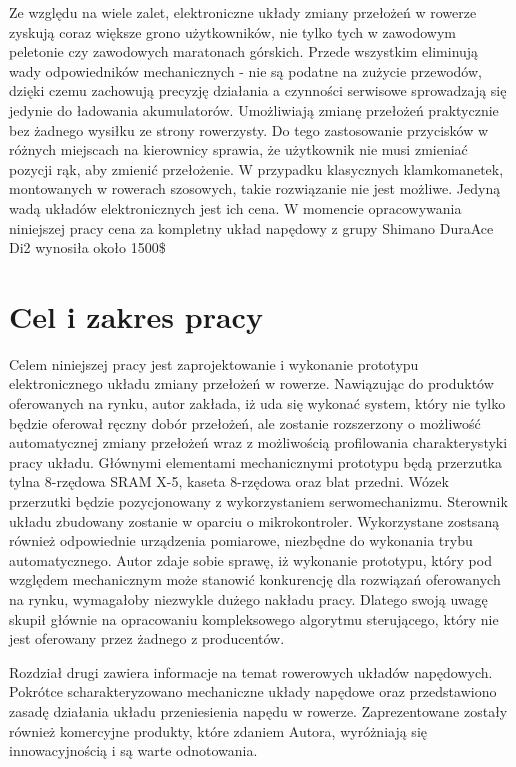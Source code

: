 Ze względu na wiele zalet, elektroniczne układy zmiany przełożeń w rowerze zyskują coraz większe grono użytkowników, nie tylko tych w zawodowym peletonie czy zawodowych maratonach górskich. Przede wszystkim eliminują wady odpowiedników mechanicznych - nie są podatne na zużycie przewodów, dzięki czemu zachowują precyzję działania a czynności serwisowe sprowadzają się jedynie do ładowania akumulatorów. Umożliwiają zmianę przełożeń praktycznie bez żadnego wysiłku ze strony rowerzysty. Do tego zastosowanie przycisków w różnych miejscach na kierownicy sprawia, że użytkownik nie musi zmieniać pozycji rąk, aby zmienić przełożenie. W przypadku klasycznych klamkomanetek, montowanych w rowerach szosowych, takie rozwiązanie nie jest możliwe. Jedyną wadą układów elektronicznych jest ich cena. W momencie opracowywania niniejszej pracy cena za kompletny układ napędowy z grupy Shimano DuraAce Di2 wynosiła około 1500\$

\section{Cel i zakres pracy}
\label{sec:Cel Pracy}
Celem niniejszej pracy jest zaprojektowanie i wykonanie prototypu elektronicznego układu zmiany przełożeń w rowerze. Nawiązując do produktów oferowanych na rynku, autor zakłada, iż uda się wykonać system, który nie tylko będzie oferował ręczny dobór przełożeń, ale zostanie rozszerzony o możliwość automatycznej zmiany przełożeń wraz z możliwością profilowania charakterystyki pracy układu. Głównymi elementami mechanicznymi prototypu będą przerzutka tylna 8-rzędowa SRAM X-5, kaseta 8-rzędowa oraz blat przedni. Wózek przerzutki będzie pozycjonowany z wykorzystaniem serwomechanizmu. Sterownik układu zbudowany zostanie w oparciu o mikrokontroler. Wykorzystane zostsaną również odpowiednie urządzenia pomiarowe, niezbędne do wykonania trybu automatycznego. Autor zdaje sobie sprawę, iż wykonanie prototypu, który pod względem mechanicznym może stanowić konkurencję dla rozwiązań oferowanych na rynku, wymagałoby niezwykle dużego nakładu pracy. Dlatego swoją uwagę skupił głównie na opracowaniu kompleksowego algorytmu sterującego, który nie jest oferowany przez żadnego z producentów.

Rozdział drugi zawiera informacje na temat rowerowych układów napędowych. Pokrótce scharakteryzowano mechaniczne układy napędowe oraz przedstawiono zasadę działania układu przeniesienia napędu w rowerze. Zaprezentowane zostały również komercyjne produkty, które zdaniem Autora, wyróżniają się innowacyjnością i są warte odnotowania.  

